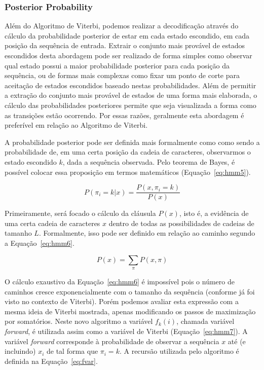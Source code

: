 \subsubsection{Posterior Probability}
\label{ssec:posterior.probability}

Além do Algoritmo de Viterbi, podemos realizar a decodificação através do cálculo da probabilidade posterior de estar em cada estado escondido, em cada posição da sequência de entrada. Extrair o conjunto mais provável de estados escondidos desta abordagem pode ser realizado de forma simples como observar qual estado possui a maior probabilidade posterior para cada posição da sequência, ou de formas mais complexas como fixar um ponto de corte para aceitação de estados escondidos baseado nestas probabilidades. Além de permitir a extração do conjunto mais provável de estados de uma forma mais elaborada, o cálculo das probabilidades posteriores permite que seja visualizada a forma como as transições estão ocorrendo. Por essas razões, geralmente esta abordagem é preferível em relação ao Algoritmo de Viterbi.

A probabilidade posterior pode ser definida mais formalmente como como sendo a probabilidade de, em uma certa posição da cadeia de caracteres, observarmos o estado escondido  $ k $, dada a sequência observada. Pelo teorema de Bayes, é possível colocar essa proposição em termos matemáticos (Equação~\ref{eq:hmm5}).

\begin{equation}\label{eq:hmm5}
    P(\pi_i = k | x) = \frac{P(x, \pi_i = k)}{P(x)}
\end{equation}

Primeiramente, será focado o cálculo da cláusula $ P(x) $, isto é, a evidência de uma certa cadeia de caracteres $ x $ dentro de todas as possibilidades de cadeias de tamanho $ L $. Formalmente, isso pode ser definido em relação ao caminho segundo a Equação~\ref{eq:hmm6}.

\begin{equation}\label{eq:hmm6}
    P(x) = \sum_{\pi} P(x,\pi)
\end{equation}

O cálculo exaustivo da Equação~\ref{eq:hmm6} é impossível pois o número de caminhos cresce exponencialmente com o tamanho da sequência (conforme já foi visto no contexto de Viterbi). Porém podemos avaliar esta expressão com a mesma ideia de Viterbi mostrada, apenas modificando os passos de maximização por somatórios. Neste novo algoritmo a variável $ f_k(i) $, chamada variável \emph{forward}, é utilizada assim como a variável de Viterbi (Equação~\ref{eq:hmm7}). A variável \emph{forward} corresponde à probabilidade de observar a sequência $ x $ até (e incluindo) $ x_i $ de tal forma que $ \pi_i = k $. A recursão utilizada pelo algoritmo é definida na Equação~\ref{eq:fvar}.

